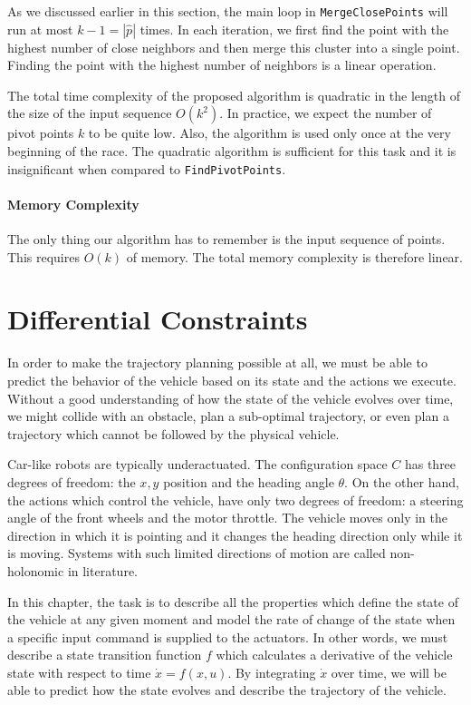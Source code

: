As we discussed earlier in this section, the main loop in \texttt{MergeClosePoints} will run at most $k-1=|\hat{p}|$ times. In each iteration, we first find the point with the highest number of close neighbors and then merge this cluster into a single point. Finding the point with the highest number of neighbors is a linear operation.

The total time complexity of the proposed algorithm is quadratic in the length of the size of the input sequence $O(k^2)$. In practice, we expect the number of pivot points $k$ to be quite low. Also, the algorithm is used only once at the very beginning of the race. The quadratic algorithm is sufficient for this task and it is insignificant when compared to \texttt{FindPivotPoints}.

\paragraph{Memory Complexity}
The only thing our algorithm has to remember is the input sequence of points. This requires $O(k)$ of memory. The total memory complexity is therefore linear.

\section{Differential Constraints}
\label{sec:vehicle_model}

In order to make the trajectory planning possible at all, we must be able to predict the behavior of the vehicle based on its state and the actions we execute. Without a good understanding of how the state of the vehicle evolves over time, we might collide with an obstacle, plan a sub-optimal trajectory, or even plan a trajectory which cannot be followed by the physical vehicle.

Car-like robots are typically underactuated. The configuration space $C$ has three degrees of freedom: the $x, y$ position and the heading angle $\theta$. On the other hand, the actions which control the vehicle, have only two degrees of freedom: a steering angle of the front wheels and the motor throttle. The vehicle moves only in the direction in which it is pointing and it changes the heading direction only while it is moving. Systems with such limited directions of motion are called non-holonomic in literature.

In this chapter, the task is to describe all the properties which define the state of the vehicle at any given moment and model the rate of change of the state when a specific input command is supplied to the actuators. In other words, we must describe a state transition function $f$ which calculates a derivative of the vehicle state with respect to time $\dot{x}=f(x, u)$. By integrating $\dot{x}$ over time, we will be able to predict how the state evolves and describe the trajectory of the vehicle.

